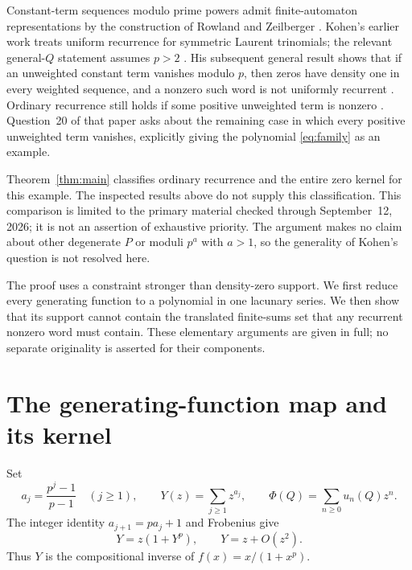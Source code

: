 \documentclass[11pt]{article}
\theoremstyle{remark}
\begin{document}
Constant-term sequences modulo prime powers admit finite-automaton
representations by the construction of Rowland and Zeilberger
\cite{RowlandZeilberger2014}. Kohen's earlier work treats uniform recurrence
for symmetric Laurent trinomials; the relevant general-$Q$ statement
assumes $p>2$ \cite[Proposition~15]{Kohen2025}.
His subsequent general result shows that if an unweighted constant term
vanishes modulo $p$, then zeros have density one in every weighted sequence,
and a nonzero such word is not uniformly recurrent
\cite[Theorem~14]{Kohen2026}. Ordinary recurrence still holds if some
positive unweighted term is nonzero \cite[Proposition~19]{Kohen2026}.
Question~20 of that paper asks about the remaining case in which every
positive unweighted term vanishes, explicitly giving the polynomial
\eqref{eq:family} as an example.

Theorem~\ref{thm:main} classifies ordinary recurrence and the entire zero
kernel for this example. The inspected results above do not supply this
classification. This comparison is limited to the primary material checked
through September~12, 2026; it is not an assertion of exhaustive priority.
The argument makes no claim about other degenerate $P$ or moduli $p^a$ with
$a>1$, so the generality of Kohen's question is not resolved here.

The proof uses a constraint stronger than density-zero support. We first
reduce every generating function to a polynomial in one lacunary series.
We then show that its support cannot contain the translated finite-sums set
that any recurrent nonzero word must contain. These elementary arguments
are given in full; no separate originality is asserted for their components.

\section{The generating-function map and its kernel}

Set
\begin{equation}\label{eq:Y}
 a_j=\frac{p^j-1}{p-1}\quad(j\geq1),\qquad
 Y(z)=\sum_{j\geq1}z^{a_j},\qquad
 \Phi(Q)=\sum_{n\geq0}u_n(Q)z^n.
\end{equation}
The integer identity $a_{j+1}=p a_j+1$ and Frobenius give
\begin{equation}\label{eq:inverse}
 Y=z(1+Y^p),\qquad Y=z+O(z^2).
\end{equation}
Thus $Y$ is the compositional inverse of $f(x)=x/(1+x^p)$.
\end{document}
